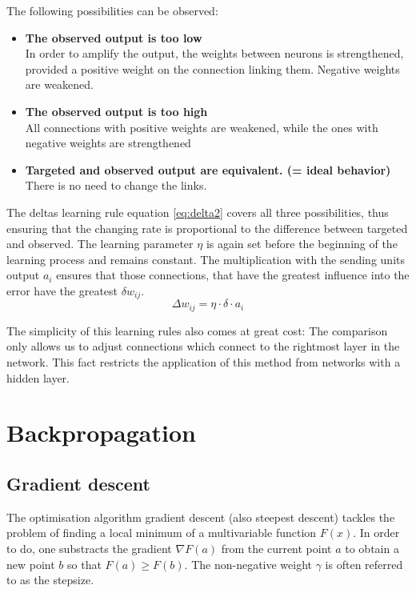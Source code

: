 \documentclass[10pt,a4paper,DIV=11]{scrreprt}
\begin{document}
The following possibilities can be observed:
\begin{itemize}
\item \textbf{The observed output is too low}\\
In order to amplify the output, the weights between neurons is strengthened, provided a positive weight on the connection linking them. Negative weights are weakened.
\item \textbf{The observed output is too high}\\
All connections with positive weights are weakened, while the ones with negative weights are strengthened 
\item \textbf{Targeted and observed output are equivalent. (= ideal behavior)}\\ There is no need to change the links.
\end{itemize}

The deltas learning rule equation \eqref{eq:delta2} covers all three possibilities, thus ensuring that the changing rate is proportional to the difference between targeted and observed. The learning parameter $\eta$ is again set before the beginning of the learning process and remains constant. The multiplication with the sending units output $a_i$ ensures that those connections, that have the greatest influence into the error have the greatest $\delta w_{ij}$.
\begin{equation}
\Delta w_{ij} = \eta \cdot \delta \cdot a_i
\label{eq:delta2}
\end{equation}

The simplicity of this learning rules also comes at great cost: The comparison only allows us to adjust connections which connect to the rightmost layer in the network. This fact restricts the application of this method from networks with a hidden layer. 

\section{Backpropagation}

\subsection{Gradient descent}

The optimisation algorithm gradient descent (also steepest descent) tackles the problem of finding a local minimum of a multivariable function $F(x)$. In order to do, one substracts the gradient $\nabla F(a)$ from the current point $a$ to obtain a new point $b$ so that $F(a) \geq F(b)$. The non-negative weight $\gamma$ is often referred to as the stepsize.
\end{document}

